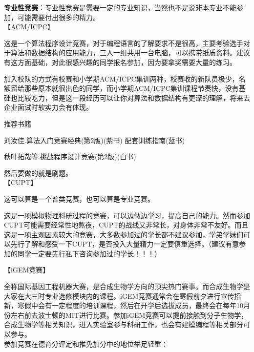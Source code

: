 \documentclass[
decoration,  %
]{qyxf-book}
\begin{document}
\noindent\textbf{专业性竞赛}：专业性竞赛是需要一定的专业知识，当然也不是说非本专业不能参加，可能需要付出很多的精力。\\
【ACM/ICPC】\par
这是一个算法程序设计竞赛，对于编程语言的了解要求不是很高，主要考验选手对于算法和数据结构的应用能力，三人一组共用一台电脑，可以携带纸质资料。建议有这方面基础，对此很感兴趣的同学报名参加，因为要拿奖需要大量的练习。\par
加入校队的方式有校赛和小学期ACM/ICPC集训两种，校赛收的新队员极少，名额留给那些原本就很出色的同学，而小学期ACM/ICPC集训课程节奏快，没有基础也比较吃力，但是这一段经历可以让你对算法和数据结构有更深的理解，将来去企业面试时软实力会有体现。\par
推荐书籍\par
刘汝佳.算法入门竞赛经典(第2版)(紫书) 配套训练指南(蓝书)\par
秋叶拓哉等.挑战程序设计竞赛(第2版)(白书)\par
然后要做的就是刷题。\\
【CUPT】\par
这可以算是一个普类竞赛，也可以算是专业竞赛。\par
这是一项模拟物理科研过程的竞赛，可以边做边学习，提高自己的能力。然而参加CUPT可能需要经常性地熬夜，CUPT的战线又非常长，对身体非常不友好。而且这是一项主观因素较大的竞赛，大多数参加过的学长都不建议参加，学弟学妹们可以先行了解和感受一下CUPT，是否投入大量精力一定要慎重选择。（建议有意参加的同学一定要先行私下咨询参加过的学长！！！）\par
【iGEM竞赛】\par
全称国际基因工程机器大赛，是合成生物学方向的顶尖热门赛事。而合成生物学是大家在大三时专业选修模块内的课程。iGEM竞赛通常会在寒假前夕进行宣传招新，寒假中会有一定程度的培训课程，然后在开学后选拔成员，最终会在每年10月份左右前去波士顿的MIT进行比赛。参加iGEM竞赛可以提前接触到分子生物学，合成生物学等相关知识，进入实验室参与科研工作，也会有建模编程等相关部分可以参与。\\

参加竞赛在德育分评定和推免加分中的地位举足轻重：
\end{document}
